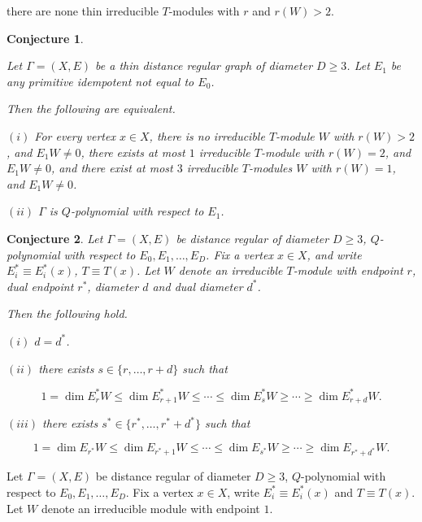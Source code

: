 \documentclass[
]{book}
\newtheorem{conjecture}{Conjecture}[chapter]
\theoremstyle{definition}
\theoremstyle{definition}
\theoremstyle{definition}
\theoremstyle{definition}
\theoremstyle{remark}
\begin{document}
there are none thin irreducible \(T\)-modules with \(r%
\) and \(r(W) > 2\).

\begin{conjecture}
\protect\hypertarget{cnj:q-polynomial}{}\label{cnj:q-polynomial}

Let \(\Gamma = (X, E)\) be a thin distance regular graph of diameter \(D\geq 3\). Let \(E_1\) be any primitive idempotent not equal to \(E_0\).

Then the following are equivalent.

\((i)\) For every vertex \(x\in X\), there is no irreducible \(T\)-module \(W\) with \(r(W)>2\), and \(E_1W\neq 0\), there exists at most \(1\) irreducible \(T\)-module with \(r(W) =2\), and \(E_1W \neq 0\), and there exist at most \(3\) irreducible \(T\)-modules \(W\) with \(r(W)=1\), and \(E_1W\neq 0\).

\((ii)\) \(\Gamma\) is \(Q\)-polynomial with respect to \(E_1\).

\end{conjecture}

\begin{conjecture}
\protect\hypertarget{cnj:unimodality}{}\label{cnj:unimodality}Let \(\Gamma = (X, E)\) be distance regular of diameter \(D\geq 3\), \(Q\)-polynomial with respect to \(E_0, E_1, \ldots, E_D\).
Fix a vertex \(x\in X\), and write \(E^*_i\equiv E^*_i(x)\), \(T\equiv T(x)\). Let \(W\) denote an irreducible \(T\)-module with endpoint \(r\), dual endpoint \(r^*\), diameter \(d\) and dual diameter \(d^*\).

Then the following hold.

\((i)\) \(d = d^*\).

\((ii)\) there exists \(s \in \{r, \ldots, r+d\}\) such that

\[1 = \dim E^*_rW \leq \dim E^*_{r+1}W \leq \cdots \leq \dim E^*_sW \geq \cdots \geq \dim E^*_{r+d}W.\]

\((iii)\) there exists \(s^* \in \{r^*, \ldots, r^*+d^*\}\) such that

\[1 = \dim E_{r^*}W \leq \dim E_{r^*+1}W \leq \cdots \leq \dim E_{s^*}W \geq \cdots \geq \dim E_{r^*+d^*}W.\]
\end{conjecture}

Let \(\Gamma = (X, E)\) be distance regular of diameter \(D\geq 3\), \(Q\)-polynomial with respect to \(E_0, E_1, \ldots, E_D\). Fix a vertex \(x\in X\), write \(E^*_i\equiv E^*_i(x)\) and \(T \equiv T(x)\). Let \(W\) denote an irreducible module with endpoint \(1\).
\end{document}

